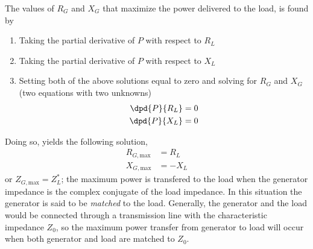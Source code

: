 The values of $R_G$ and $X_G$ that maximize the power delivered to the load, is found by 
\begin{enumerate}
\item Taking the partial derivative of $P$ with respect to $R_L$
\item Taking the partial derivative of $P$ with respect to $X_L$
\item Setting both of the above solutions equal to zero and solving for $R_G$ and $X_G$ (two equations with two unknowns)
    \begin{align}
        \dpd{P}{R_L} &= 0 \\
        \dpd{P}{X_L} &= 0
    \end{align}
\end{enumerate}
Doing so, yields the following solution,
\begin{equation}
    \begin{aligned}
        R_{G,\text{max}} &= R_L \\
        X_{G,\text{max}} &= -X_L
    \end{aligned}
\end{equation}
or $Z_{G,\text{max}} = Z^*_L$; the maximum power is transfered to the load when the generator impedance is the complex conjugate of the load impedance. In this situation the generator is said to be \emph{matched} to the load. Generally, the generator and the load would be connected through a transmission line with the characteristic impedance $Z_0$, so the maximum power transfer from generator to load will occur when both generator and load are matched to $Z_0$. 






